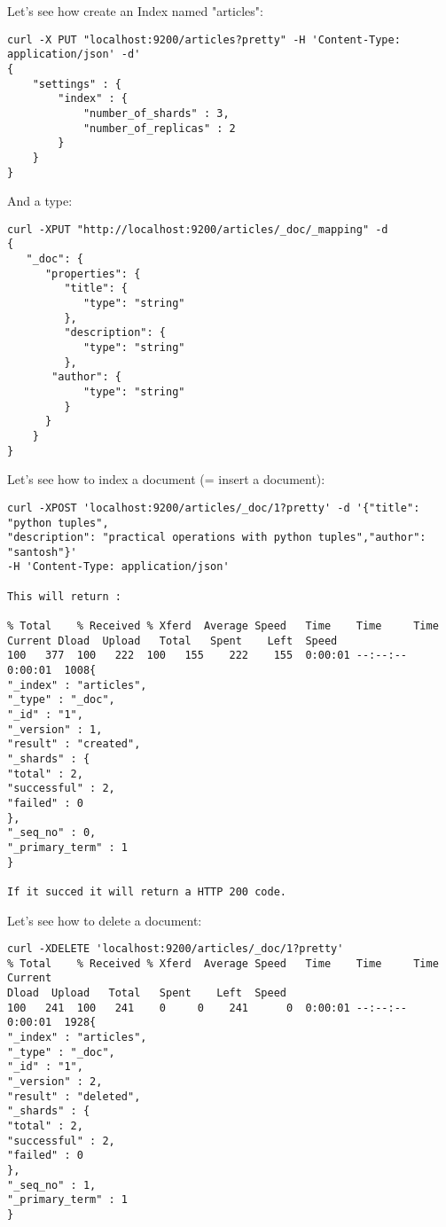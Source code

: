 \documentclass{beamer}[10pt, usepdftitle=false handout]
\begin{document}
\begin{frame}[fragile]

Let's see how create an Index named "articles":
\vspace*{0.6em}

\begingroup
\fontsize{6pt}{8pt}\selectfont
\begin{verbatim}
curl -X PUT "localhost:9200/articles?pretty" -H 'Content-Type: application/json' -d'
{
    "settings" : {
        "index" : {
            "number_of_shards" : 3, 
            "number_of_replicas" : 2 
        }
    }
}
\end{verbatim}
\endgroup

And a type:
\begingroup
\fontsize{6pt}{8pt}\selectfont
\begin{verbatim}
curl -XPUT "http://localhost:9200/articles/_doc/_mapping" -d
{
   "_doc": {
      "properties": {
         "title": {
            "type": "string"
         },
         "description": {
            "type": "string"
         },
 	   "author": {
            "type": "string"
         }
      }
    }
}
\end{verbatim}
\endgroup
\end{frame}
\begin{frame}[fragile]
Let's see how to index a document (= insert a document):

\begingroup
\fontsize{6pt}{8pt}\selectfont
\begin{verbatim}
curl -XPOST 'localhost:9200/articles/_doc/1?pretty' -d '{"title": "python tuples",
"description": "practical operations with python tuples","author": "santosh"}' 
-H 'Content-Type: application/json'

This will return :

% Total    % Received % Xferd  Average Speed   Time    Time     Time  Current Dload  Upload   Total   Spent    Left  Speed
100   377  100   222  100   155    222    155  0:00:01 --:--:--  0:00:01  1008{
"_index" : "articles",
"_type" : "_doc",
"_id" : "1",
"_version" : 1,
"result" : "created",
"_shards" : {
"total" : 2,
"successful" : 2,
"failed" : 0
},
"_seq_no" : 0,
"_primary_term" : 1
}

If it succed it will return a HTTP 200 code.
\end{verbatim}
\endgroup
\end{frame}
\begin{frame}[fragile]
Let's see how to delete a document:
\vspace*{0.6em}

\begingroup
\fontsize{6pt}{8pt}\selectfont
\begin{verbatim}
curl -XDELETE 'localhost:9200/articles/_doc/1?pretty'
% Total    % Received % Xferd  Average Speed   Time    Time     Time  Current
Dload  Upload   Total   Spent    Left  Speed
100   241  100   241    0     0    241      0  0:00:01 --:--:--  0:00:01  1928{
"_index" : "articles",
"_type" : "_doc",
"_id" : "1",
"_version" : 2,
"result" : "deleted",
"_shards" : {
"total" : 2,
"successful" : 2,
"failed" : 0
},
"_seq_no" : 1,
"_primary_term" : 1
}
\end{verbatim}
\endgroup

\end{frame}
\end{document}

